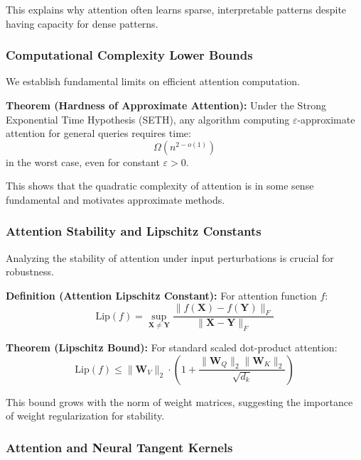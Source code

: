\documentclass[11pt]{article}
\begin{document}
This explains why attention often learns sparse, interpretable patterns despite having capacity for dense patterns.

\subsubsection{Computational Complexity Lower Bounds}

We establish fundamental limits on efficient attention computation.

\textbf{Theorem (Hardness of Approximate Attention):} Under the Strong Exponential Time Hypothesis (SETH), any algorithm computing $\varepsilon$-approximate attention for general queries requires time:
\begin{equation}
\Omega(n^{2-o(1)})
\end{equation}
in the worst case, even for constant $\varepsilon > 0$.

This shows that the quadratic complexity of attention is in some sense fundamental and motivates approximate methods.

\subsubsection{Attention Stability and Lipschitz Constants}

Analyzing the stability of attention under input perturbations is crucial for robustness.

\textbf{Definition (Attention Lipschitz Constant):} For attention function $f$:
\begin{equation}
\text{Lip}(f) = \sup_{\mathbf{X} \neq \mathbf{Y}} \frac{\|f(\mathbf{X}) - f(\mathbf{Y})\|_F}{\|\mathbf{X} - \mathbf{Y}\|_F}
\end{equation}

\textbf{Theorem (Lipschitz Bound):} For standard scaled dot-product attention:
\begin{equation}
\text{Lip}(f) \leq \|\mathbf{W}_V\|_2 \cdot \left(1 + \frac{\|\mathbf{W}_Q\|_2 \|\mathbf{W}_K\|_2}{\sqrt{d_k}}\right)
\end{equation}

This bound grows with the norm of weight matrices, suggesting the importance of weight regularization for stability.

\subsubsection{Attention and Neural Tangent Kernels}
\end{document}
